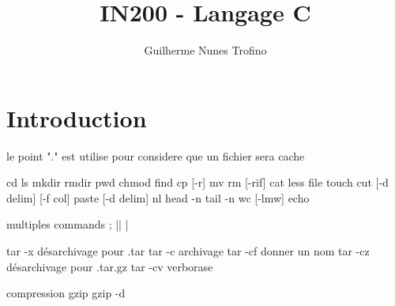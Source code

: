 \documentclass{article}
\title{IN200 - Langage C}
\author{Guilherme Nunes Trofino}
\begin{document}
\maketitle

\newpage\tableofcontents

\section{Introduction}
le point "." est utilise pour considere que un fichier sera cache

cd
ls
mkdir
rmdir
pwd
chmod
find
cp [-r]
mv
rm [-rif]
cat
less
file
touch
cut [-d delim] [-f col]
paste [-d delim]
nl
head -n
tail -n
wc [-lmw]
echo

multiples commands
;
||
|



tar -x désarchivage pour .tar
tar -c archivage
tar -cf donner un nom
tar -cz désarchivage pour .tar.gz
tar -cv verborase

compression
gzip
gzip -d
\end{document}
